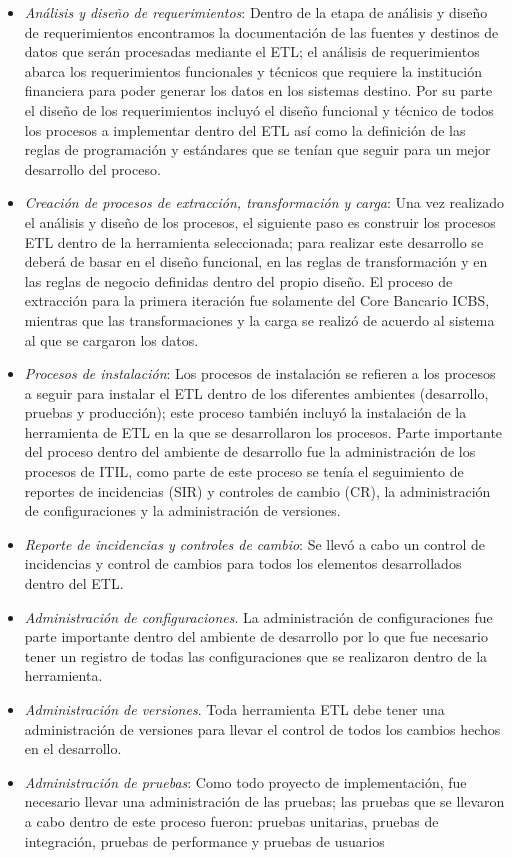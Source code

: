 \documentclass[a4paper,openright,12pt]{book}
\begin{document}
\begin{itemize}
\item \textit{Análisis y diseño de requerimientos}: Dentro de la etapa de análisis y diseño de requerimientos encontramos la documentación de las fuentes y destinos de datos que serán procesadas mediante el ETL; el análisis de requerimientos abarca los requerimientos funcionales y técnicos que requiere la institución financiera para poder generar los datos en los sistemas destino. 
Por su parte el diseño de los requerimientos incluyó el diseño funcional y técnico de todos los procesos a implementar dentro del ETL así como la definición de las reglas de programación y estándares que se tenían que seguir para un mejor desarrollo del proceso.
\item \textit{Creación de procesos de extracción, transformación y carga}: Una vez realizado el análisis y diseño de los procesos, el siguiente paso es construir los procesos ETL dentro de la herramienta seleccionada; para realizar este desarrollo se deberá de basar en el diseño funcional, en las reglas de transformación y en las reglas de negocio definidas dentro del propio diseño. El proceso de extracción para la primera iteración fue solamente del Core Bancario ICBS, mientras que las transformaciones y la carga se realizó de acuerdo al sistema al que se cargaron los datos.
\item \textit{Procesos de instalación}: Los procesos de instalación se refieren a los procesos a seguir para instalar el ETL dentro de los diferentes ambientes (desarrollo, pruebas y producción); este proceso también incluyó la instalación de la herramienta de ETL en la que se desarrollaron los procesos.
Parte importante del proceso dentro del ambiente de desarrollo fue la administración de los procesos de ITIL, como parte de este proceso se tenía el seguimiento de reportes de incidencias (SIR) y controles de cambio (CR), la administración de configuraciones y la administración de versiones.
\item \textit{Reporte de incidencias y controles de cambio}: Se llevó a cabo un control de incidencias y control de cambios para todos los elementos desarrollados dentro del ETL.

\item \textit{Administración de configuraciones}. La administración de configuraciones fue parte importante dentro del ambiente de desarrollo por lo que fue necesario tener un registro de todas las configuraciones que se realizaron dentro de la herramienta.

\item \textit{Administración de versiones}. Toda herramienta ETL debe tener una administración de versiones para llevar el control de todos los cambios hechos en el desarrollo.

\item \textit{Administración de pruebas}: Como todo proyecto de implementación, fue necesario llevar una administración de las pruebas; las pruebas que se llevaron a cabo dentro de este proceso fueron: pruebas unitarias, pruebas de integración, pruebas de performance y pruebas de usuarios
\end{itemize}
\end{document}
